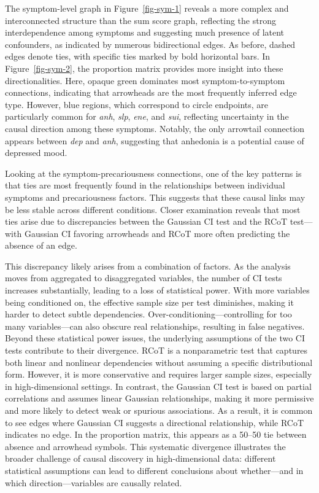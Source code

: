 \documentclass[
]{article}
\begin{document}
The symptom-level graph in Figure~\ref{fig-sym-1} reveals a more complex
and interconnected structure than the sum score graph, reflecting the
strong interdependence among symptoms and suggesting much presence of
latent confounders, as indicated by numerous bidirectional edges. As
before, dashed edges denote ties, with specific ties marked by bold
horizontal bars. In Figure~\ref{fig-sym-2}, the proportion matrix
provides more insight into these directionalities. Here, opaque green
dominates most symptom-to-symptom connections, indicating that
arrowheads are the most frequently inferred edge type. However, blue
regions, which correspond to circle endpoints, are particularly common
for \emph{anh}, \emph{slp}, \emph{ene}, and \emph{sui}, reflecting
uncertainty in the causal direction among these symptoms. Notably, the
only arrowtail connection appears between \emph{dep} and \emph{anh},
suggesting that anhedonia is a potential cause of depressed mood.

Looking at the symptom-precariousness connections, one of the key
patterns is that ties are most frequently found in the relationships
between individual symptoms and precariousness factors. This suggests
that these causal links may be less stable across different conditions.
Closer examination reveals that most ties arise due to discrepancies
between the Gaussian CI test and the RCoT test---with Gaussian CI
favoring arrowheads and RCoT more often predicting the absence of an
edge.

This discrepancy likely arises from a combination of factors. As the
analysis moves from aggregated to disaggregated variables, the number of
CI tests increases substantially, leading to a loss of statistical
power. With more variables being conditioned on, the effective sample
size per test diminishes, making it harder to detect subtle
dependencies. Over-conditioning---controlling for too many
variables---can also obscure real relationships, resulting in false
negatives. Beyond these statistical power issues, the underlying
assumptions of the two CI tests contribute to their divergence. RCoT is
a nonparametric test that captures both linear and nonlinear
dependencies without assuming a specific distributional form. However,
it is more conservative and requires larger sample sizes, especially in
high-dimensional settings. In contrast, the Gaussian CI test is based on
partial correlations and assumes linear Gaussian relationships, making
it more permissive and more likely to detect weak or spurious
associations. As a result, it is common to see edges where Gaussian CI
suggests a directional relationship, while RCoT indicates no edge. In
the proportion matrix, this appears as a 50--50 tie between absence and
arrowhead symbols. This systematic divergence illustrates the broader
challenge of causal discovery in high-dimensional data: different
statistical assumptions can lead to different conclusions about
whether---and in which direction---variables are causally related.
\end{document}
